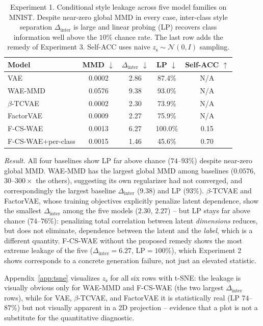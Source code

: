 \documentclass[10pt,letterpaper]{article}
\newcommand{\ours}{F-CS-WAE}
\newcommand{\zs}{z_{\mathrm{s}}}
\begin{document}
\begin{table}[t]
\centering
\small
\caption{Experiment 1. Conditional style leakage across five model families
         on MNIST. Despite near-zero global MMD in every case, inter-class
         style separation $\Delta_{\mathrm{inter}}$ is large and linear
         probing (LP) recovers class information well above the $10\%$
         chance rate. The last row adds the remedy of Experiment 3.
         Self-ACC uses naive $\zs\sim\mathcal{N}(0,I)$ sampling.}
\label{tab:cross-model}
\begin{tabular}{lcccc}
\toprule
Model & MMD $\downarrow$ & $\Delta_{\mathrm{inter}}$ $\downarrow$ & LP $\downarrow$ & Self-ACC $\uparrow$ \\
\midrule
VAE              & 0.0002 & 2.86 & 87.4\% & N/A \\
WAE-MMD          & 0.0576 & 9.38 & 93.0\% & N/A \\
$\beta$-TCVAE    & 0.0002 & 2.30 & 73.9\% & N/A \\
FactorVAE        & 0.0009 & 2.27 & 75.9\% & N/A \\
\ours{}          & 0.0013 & 6.27 & 100.0\% & 0.15 \\
\midrule
\ours{}+per-class & 0.0015 & 1.46 & 45.6\% & 0.70 \\
\bottomrule
\end{tabular}
\end{table}

\emph{Result.} All four baselines show LP far above chance ($74$--$93\%$)
despite near-zero global MMD. WAE-MMD has the largest global MMD among
baselines ($0.0576$, $30$--$300\times$ the others), suggesting its own
regularizer had not converged, and correspondingly the largest baseline
$\Delta_{\mathrm{inter}}$ ($9.38$) and LP ($93\%$). $\beta$-TCVAE and
FactorVAE, whose training objectives explicitly penalize latent dependence,
show the smallest $\Delta_{\mathrm{inter}}$ among the five models ($2.30$,
$2.27$) -- but LP stays far above chance ($74$--$76\%$): penalizing total
correlation between latent \emph{dimensions} reduces, but does not
eliminate, dependence between the latent and the \emph{label}, which is a
different quantity. \ours{} without the proposed remedy shows the most
extreme leakage of the five ($\Delta_{\mathrm{inter}}=6.27$, LP$=100\%$),
which Experiment 2 shows corresponds to a concrete generation failure, not
just an elevated statistic.

Appendix~\ref{app:tsne} visualizes $\zs$ for all six rows with t-SNE: the
leakage is visually obvious only for WAE-MMD and \ours{} (the two largest
$\Delta_{\mathrm{inter}}$ rows), while for VAE, $\beta$-TCVAE, and
FactorVAE it is statistically real (LP $74$--$87\%$) but not visually
apparent in a 2D projection -- evidence that a plot is not a substitute for
the quantitative diagnostic.
\end{document}
